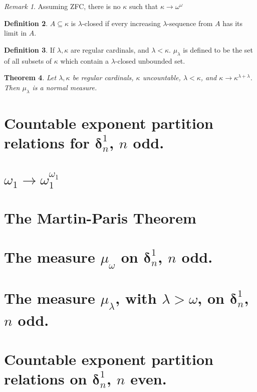 \documentclass[bibother]{asl}
\newtheorem{thm}{Theorem}[section]
\theoremstyle{definition}
\newtheorem{defn}[thm]{Definition}
\theoremstyle{remark}
\newtheorem{rem}[thm]{Remark}
\newcommand{\bd}{\boldsymbol{\delta}}
\begin{document}
\begin{rem}
Assuming ZFC, there is no $\kappa$ such that $\kappa \to \omega^\omega$ 
\end{rem}

\begin{defn}
$A\subseteq \kappa$ is $\lambda$-closed if every increasing $\lambda$-sequence from $A$ has its limit in $A$.
\end{defn}

\begin{defn}
If $\lambda, \kappa$ are regular cardinals, and $\lambda<\kappa$. $\mu_\lambda$ is defined to be  the set of all subsets of $\kappa$ which contain a $\lambda$-closed unbounded set.
\end{defn}


\begin{thm}
Let $\lambda, \kappa$ be regular cardinals, $\kappa$ uncountable,  $\lambda<\kappa$, and $\kappa\to\kappa^{\lambda+ \lambda}$. Then $\mu_\lambda$ is a normal measure.
\end{thm}





\section{Countable exponent partition relations for $\bd^1_n$, $n$ odd.}

\section{$\omega_1 \rightarrow \omega_1^{\omega_1}$}

\section{The Martin-Paris Theorem}

\section{The measure $\mu_\omega$ on $\bd^1_n$, $n$ odd.}

\section{The measure $\mu_\lambda$, with $\lambda > \omega$, on $\bd^1_n$, $n$ odd.}

\section{Countable exponent partition relations on $\bd^1_n$, $n$ even.}
\end{document}
